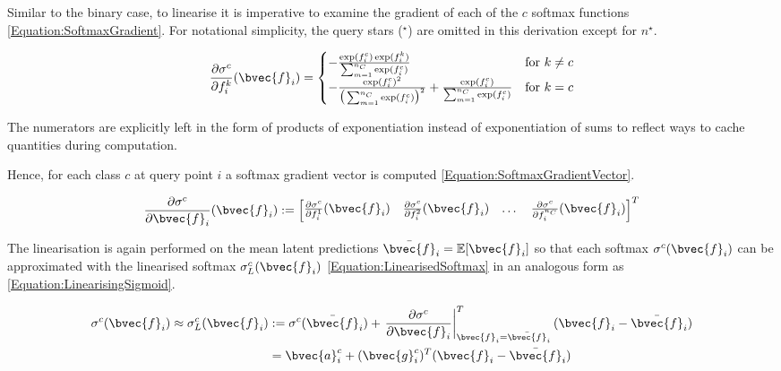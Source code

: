 				Similar to the binary case, to linearise it is imperative to examine the gradient of each of the $c$ softmax functions \eqref{Equation:SoftmaxGradient}. For notational simplicity, the query stars ($^{\star}$) are omitted in this derivation except for $n^{\star}$.
				
				\begin{equation}
					\frac{\partial \sigma^{c}}{\partial f^{k}_{i}}(\bvec{f}_{i}) =
					\begin{cases} 
						- \frac{\exp(f^{c}_{i}) \exp(f^{k}_{i})}{\sum_{m = 1}^{n_{C}} \exp({f^{c}_{i}})} & \text{for } k \neq c  \\
						- \frac{\exp(f^{c}_{i})^{2}}{\big(\sum_{m = 1}^{n_{C}} \exp({f^{c}_{i}})\big)^{2}} + \frac{\exp(f^{c}_{i})}{\sum_{m = 1}^{n_{C}} \exp({f^{c}_{i}})}& \text{for } k = c
					\end{cases}
				\label{Equation:SoftmaxGradient}
				\end{equation}			
			
				The numerators are explicitly left in the form of products of exponentiation instead of exponentiation of sums to reflect ways to cache quantities during computation. 
				
				Hence, for each class $c$ at query point $i$ a softmax gradient vector is computed \eqref{Equation:SoftmaxGradientVector}.
				
				\begin{equation}
					\frac{\partial \sigma^{c}}{\partial \bvec{f}_{i}}(\bvec{f}_{i}) := \begin{bmatrix} \frac{\partial \sigma^{c}}{\partial f^{1}_{i}}(\bvec{f}_{i}) & \frac{\partial \sigma^{c}}{\partial f^{2}_{i}}(\bvec{f}_{i}) & \dots & \frac{\partial \sigma^{c}}{\partial f^{n_{C}}_{i}}(\bvec{f}_{i}) \end{bmatrix}^{T}
				\label{Equation:SoftmaxGradientVector}
				\end{equation}
				
				The linearisation is again performed on the mean latent predictions $\bar{\bvec{f}}_{i} = \mathbb{E}[\bvec{f}_{i}]$ so that each softmax $\sigma^{c}(\bvec{f}_{i})$ can be approximated with the linearised softmax $\sigma^{c}_{L}(\bvec{f}_{i})$ \eqref{Equation:LinearisedSoftmax} in an analogous form as \eqref{Equation:LinearisingSigmoid}.
				
				\begin{equation}
					\begin{aligned}
						\sigma^{c}(\bvec{f}_{i}) \approx \sigma^{c}_{L}(\bvec{f}_{i}) & := \sigma^{c}(\bar{\bvec{f}}_{i}) + \left. \frac{\partial \sigma^{c}}{\partial \bvec{f}_{i}} \right|^{T}_{\bvec{f}_{i} = \bar{\bvec{f}}_{i}} (\bvec{f}_{i} - \bar{\bvec{f}}_{i}) \\
						& = \bvec{a}^{c}_{i} + (\bvec{g}^{c}_{i})^{T} (\bvec{f}_{i} - \bar{\bvec{f}}_{i})
					\end{aligned}
				\label{Equation:LinearisedSoftmax}
				\end{equation}
				
